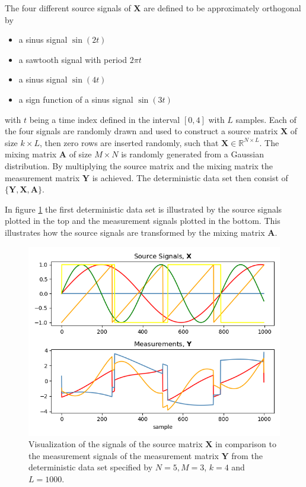 The four different source signals of $\mathbf{X}$ are defined to be approximately orthogonal by
\begin{itemize}
\item[1.] a sinus signal $\sin(2t)$
\item[2.] a sawtooth signal with period $2 \pi t$
\item[3.] a sinus signal $\sin(4t)$
\item[4.] a sign function of a sinus signal $\sin(3t)$
\end{itemize}
 with $t$ being a time index defined in the interval $[0,4]$ with $L$ samples. 
Each of the four signals are randomly drawn and used to construct a source matrix $\mathbf{X}$ of size $k \times L$, then zero rows are inserted randomly, such that $\mathbf{X} \in \mathbb{R}^{N \times L}$. 
The mixing matrix $\mathbf{A}$ of size $M \times N$ is randomly generated from a Gaussian distribution. 
By multiplying the source matrix and the mixing matrix the measurement matrix $\mathbf{Y}$ is achieved.
The deterministic data set then consist of $\{ \mathbf{Y}, \mathbf{X}, \mathbf{A} \}$.

In figure \ref{fig:simple} the first deterministic data set is illustrated by the source signals plotted in the top and the measurement signals plotted in the bottom. 
This illustrates how the source signals are transformed by the mixing matrix $\mathbf{A}$.
\begin{figure}[H]
\centering
\includegraphics[scale=0.5]{figures/ch_6/simple_data.png}
\caption{Visualization of the signals of the source matrix $\mathbf{X}$ in comparison to the measurement signals of the measurement matrix $\mathbf{Y}$ from the deterministic data set specified by $N = 5, M = 3$, $k = 4$ and $L=1000$.}
\label{fig:simple}
\end{figure}
\noindent

